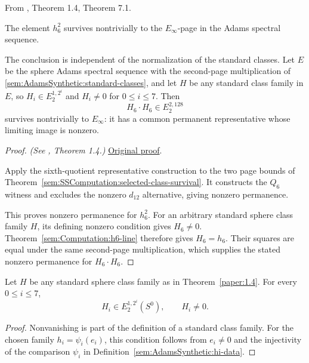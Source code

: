 \begin{theorem}[Permanence of $h_6^2$]
\label{paper:1.4}
\label{paper:7.1}
\label{thm:126survives}
From \cite{LWX126}, Theorem 1.4, Theorem 7.1.\par

\label{thm:h_6_sq}\label{thm:h62}
The element $h_6^2$ survives nontrivially to the $E_\infty$-page in the
Adams spectral sequence.


The conclusion is independent of the normalization of the standard
classes. Let $E$ be the sphere Adams spectral sequence with the
second-page multiplication of \ref{sem:AdamsSynthetic:standard-classes},
and let $H$ be any standard class family in $E$, so
$H_i\in E_2^{1,2^i}$ and $H_i\ne0$ for $0\le i\le7$. Then
\[
H_6\cdot H_6\in E_2^{2,128}
\]
survives nontrivially to $E_\infty$: it has a common permanent
representative whose limiting image is nonzero.


\end{theorem}
\begin{proof}
\textit{(See \cite{LWX126}, Theorem 1.4.)} \href{paper/main.tex.html#L2212}{Original proof}.

Apply the sixth-quotient representative construction to the two page bounds of
Theorem~\ref{sem:SSComputation:selected-class-survival}. It constructs the
$Q_6$ witness and excludes the nonzero $d_{12}$ alternative, giving
nonzero permanence.

This proves nonzero permanence for $h_6^2$. For an
arbitrary standard sphere class family $H$, its defining nonzero condition
gives $H_6\ne0$. Theorem~\ref{sem:Computation:h6-line} therefore gives
$H_6=h_6$. Their squares are equal under the same second-page multiplication,
which supplies the stated nonzero permanence for $H_6\cdot H_6$.
\end{proof}

\begin{theorem}
\label{sem:Main:standard-hi-nonzero}
Let $H$ be any standard sphere class family as in
Theorem~\ref{paper:1.4}. For every $0\le i\le7$,
\[
 H_i\in E_2^{1,2^i}(S^0),\qquad H_i\ne0.
\]
\end{theorem}
\begin{proof}
Nonvanishing is part of the definition of a standard class family.
For the chosen family $h_i=\psi_i(e_i)$, this condition follows from
$e_i\ne0$ and the injectivity of the comparison $\psi_i$ in
Definition~\ref{sem:AdamsSynthetic:hi-data}.
\end{proof}

